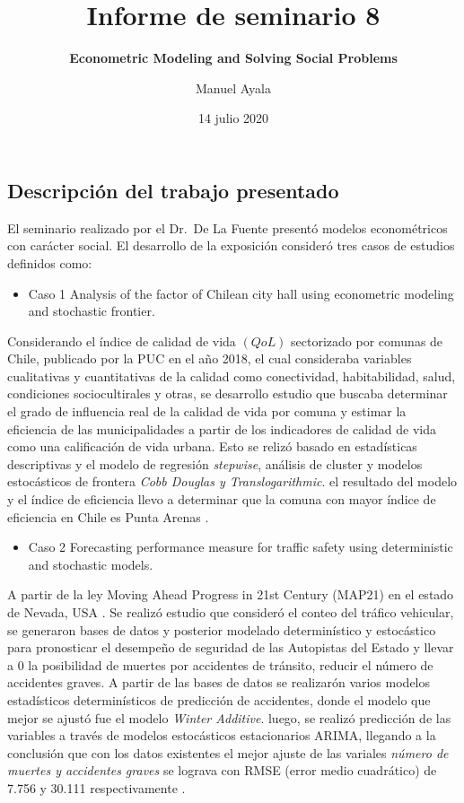 \documentclass[
  american,
]{article}
\title{Informe de seminario 8}
\subtitle{\textbf{Econometric Modeling and Solving Social Problems}}
\author{Manuel Ayala}
\date{14 julio 2020}
\providecommand{\tightlist}{%
  \setlength{\itemsep}{0pt}\setlength{\parskip}{0pt}}
\begin{document}
\maketitle

\hypertarget{descripciuxf3n-del-trabajo-presentado}{%
\subsection{Descripción del trabajo
presentado}\label{descripciuxf3n-del-trabajo-presentado}}

El seminario realizado por el Dr.~De La Fuente presentó modelos
econométricos con carácter social. El desarrollo de la exposición
consideró tres casos de estudios definidos como:

\begin{itemize}
\tightlist
\item
  Caso 1 Analysis of the factor of Chilean city hall using econometric
  modeling and stochastic frontier.
\end{itemize}

Considerando el índice de calidad de vida \((QoL)\) sectorizado por
comunas de Chile, publicado por la PUC en el año 2018, el cual
consideraba variables cualitativas y cuantitativas de la calidad como
conectividad, habitabilidad, salud, condiciones sociocultirales y otras,
se desarrollo estudio que buscaba determinar el grado de influencia real
de la calidad de vida por comuna y estimar la eficiencia de las
municipalidades a partir de los indicadores de calidad de vida como una
calificación de vida urbana. Esto se relizó basado en estadísticas
descriptivas y el modelo de regresión \emph{stepwise}, análisis de
cluster y modelos estocásticos de frontera \emph{Cobb Douglas y
Translogarithmic}. el resultado del modelo y el índice de eficiencia
llevo a determinar que la comuna con mayor índice de eficiencia en Chile
es Punta Arenas \autocite{hanns_de_la_fuente-mella_econometric_2020}.

\begin{itemize}
\tightlist
\item
  Caso 2 Forecasting performance measure for traffic safety using
  deterministic and stochastic models.
\end{itemize}

A partir de la ley Moving Ahead Progress in 21st Century (MAP21) en el
estado de Nevada, USA . Se realizó estudio que consideró el conteo del
tráfico vehicular, se generaron bases de datos y posterior modelado
determinístico y estocástico \autocite{paz_forecasting_2015} para
pronosticar el desempeño de seguridad de las Autopistas del Estado y
llevar a 0 la posibilidad de muertes por accidentes de tránsito, reducir
el número de accidentes graves. A partir de las bases de datos se
realizarón varios modelos estadísticos determinísticos de predicción de
accidentes, donde el modelo que mejor se ajustó fue el modelo
\emph{Winter Additive}. luego, se realizó predicción de las variables a
través de modelos estocásticos estacionarios ARIMA, llegando a la
conclusión que con los datos existentes el mejor ajuste de las variales
\emph{número de muertes y accidentes graves} se lograva con RMSE (error
medio cuadrático) de 7.756 y 30.111 respectivamente
\autocite{hanns_de_la_fuente-mella_econometric_2020}.
\end{document}
